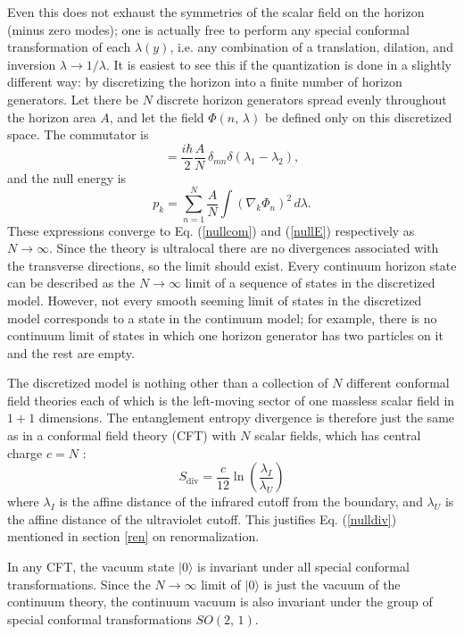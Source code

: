 \documentclass[12pt]{article}
\begin{document}
Even this does not exhaust the symmetries of the scalar field on the horizon (minus zero modes); one is actually free to perform any special conformal transformation of each $\lambda(y)$, i.e. any combination of a translation, dilation, and inversion $\lambda \to 1/\lambda$.  It is easiest to see this if the quantization is done in a slightly different way: by discretizing the horizon into a finite number of horizon generators.  Let there be $N$ discrete horizon generators spread evenly throughout the horizon area $A$, and let the field $\Phi(n,\,\lambda)$ be defined only on this discretized space.  The commutator is
\begin{equation}
[\Phi(m,\,\lambda_1),\,\nabla_k \Phi(n,\,\lambda_2)] =
\frac{i\hbar}{2}\frac{A}{N}\,\delta_{mn} \delta(\lambda_1 - \lambda_2),
\end{equation}
and the null energy is
\begin{equation}
p_k = \sum_{n = 1}^N \frac{A}{N} \int (\nabla_k \Phi_n)^2 \, d\lambda.
\end{equation}
These expressions converge to Eq. (\ref{nullcom}) and (\ref{nullE}) respectively as $N \to \infty$.  Since the theory is ultralocal there are no divergences associated with the transverse directions, so the limit should exist.  Every continuum horizon state can be described as the $N \to \infty$ limit of a sequence of states in the discretized model.  However, not every smooth seeming limit of states in the discretized model corresponds to a state in the continuum model; for example,
there is no continuum limit
of states in which one horizon generator has two particles on it and the rest are empty.

The discretized model is nothing other than a collection of $N$ different conformal field theories each of which is the left-moving sector of one massless scalar field in $1+1$ dimensions.  The entanglement entropy divergence is therefore just the same as in a conformal field theory (CFT) with $N$ scalar fields, which has central charge $c = N$ \cite{ginsparg89}:
\begin{equation}
S_\mathrm{div} = \frac{c}{12} \ln \left( \frac{\lambda_I}{\lambda_U} \right)
\end{equation}
where $\lambda_I$ is the affine distance of the infrared cutoff from the boundary, and $\lambda_U$ is the affine distance of the ultraviolet cutoff.  This justifies Eq. (\ref{nulldiv}) mentioned in section \ref{ren} on renormalization.

In any CFT, the vacuum state $| 0 \rangle$ is invariant under all special conformal transformations.  Since the $N \to \infty$ limit of $| 0 \rangle$ is just the vacuum of the continuum theory, the continuum vacuum is also invariant under the group of special conformal transformations $SO(2,\,1)$.
\end{document}
